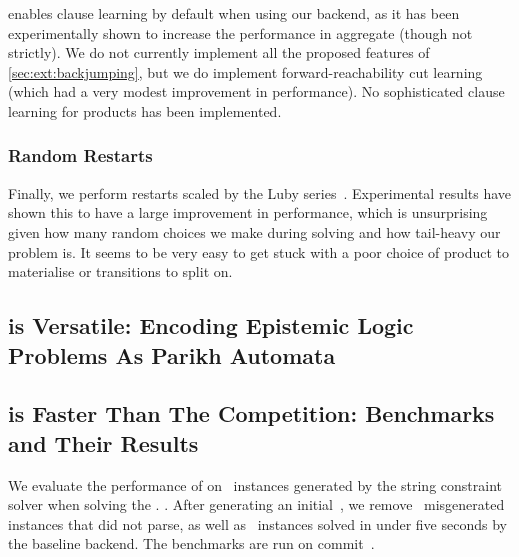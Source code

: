 \documentclass[acmsmall,review,anonymous,screen]{acmart}\settopmatter{printfolios=true,printccs=false,printacmref=true}
\theoremstyle{definition}
\newif\ifoutline
\newcommand{\contents}[1]{\ifoutline{\color{blue}
    \begin{itemize}
    #1
    \end{itemize}
  }\fi}
\begin{document}
\Catra{} enables clause learning by default when using our backend, as it has
been experimentally shown to increase the performance in aggregate (though not
strictly). We do not currently implement all the proposed features of
\cref{sec:ext:backjumping}, but we do implement forward-reachability cut
learning (which had a very modest improvement in performance). No sophisticated
clause learning for products has been implemented.

\subsubsection{Random Restarts}

Finally, we perform restarts scaled by the Luby series~\cite{luby}. Experimental
results have shown this to have a large improvement in performance, which is
unsurprising given how many random choices we make during solving and how
tail-heavy our problem is. It seems to be very easy to get stuck with a poor
choice of product to materialise or transitions to split on.

\subsection{\Catra{} is Versatile: Encoding Epistemic Logic Problems As Parikh Automata}

\contents{
\item Model-checking examples e.g. \cite{epistemic-logic}
}

\subsection{\Catra{} is Faster Than The Competition: Benchmarks and Their Results}\label{sec:experiments}

We evaluate the performance of \Catra{} on~\NrBenchmarks{} instances generated by the \Ostrich{} string constraint solver when solving the . . After generating an initial~\InitialNrBenchmarks{}, we remove~\NrBroken{} misgenerated instances that did not parse, as well as~\NrTrivial{} instances solved in under five seconds by the baseline backend. The benchmarks are run on commit~\texttt{\commit}.
\end{document}
